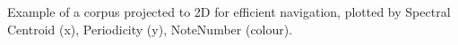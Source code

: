 Example of a corpus projected to 2D for efficient navigation, plotted by Spectral Centroid (x), Periodicity (y), NoteNumber (colour).
